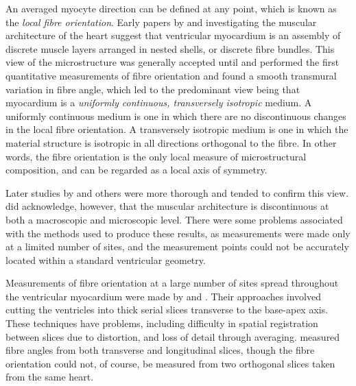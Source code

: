 An averaged myocyte direction can be defined at any point, which is known as
the \emph{local fibre orientation}.  Early papers by
\citet{maccallum:1900} and \citet{mall:1911} investigating the 
muscular architecture of the
heart suggest that ventricular myocardium is an assembly of discrete muscle
layers arranged in nested shells, or discrete fibre
bundles\cite{legrice:1992}.  This view of the microstructure was generally
accepted until \citet{hort:1957} and \citet{streeter:1966}
 performed the
first quantitative measurements of fibre orientation and found a smooth
transmural variation in fibre angle, which led to the predominant view being
that myocardium is a \emph{uniformly continuous, transversely isotropic}
medium.  A uniformly continuous medium is one in which there are no
discontinuous changes in the local fibre orientation.  A transversely isotropic
medium is one in which the material structure is isotropic in all directions
orthogonal to the fibre.  In other words, the fibre orientation is the only
local measure of microstructural composition, and can be regarded as a local
axis of symmetry.

Later studies by \citet{streeter:1969} and others were more thorough and
tended to confirm this view.  \citet{streeter:1979} did acknowledge,
however, that the muscular architecture is discontinuous at both a macroscopic
and microscopic level.  There were some problems associated with the methods
used to produce these results, as measurements were made only at a limited
number of sites, and the measurement points could not be accurately located
within a standard ventricular geometry.

Measurements of fibre orientation at a large number of sites spread throughout
the ventricular myocardium were made by \citet{nielsen:1987} and
\citet{mclean:1987}.  Their approaches involved cutting the ventricles
into thick serial slices transverse to the base-apex axis.  These techniques
have problems, including difficulty in spatial registration between slices due
to distortion, and loss of detail through averaging.  \citet{mclean:1989}
measured fibre angles from both transverse and longitudinal slices, though the
fibre orientation could not, of course, be measured from two orthogonal slices
taken from the same heart.


